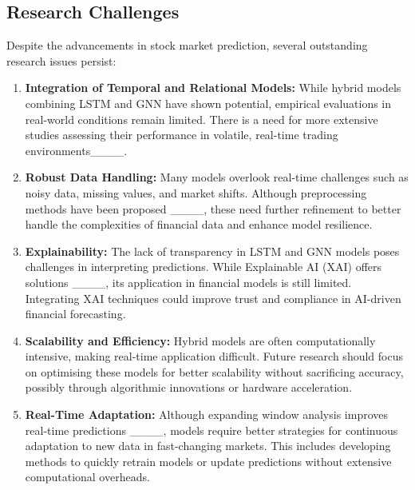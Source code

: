 \subsection{Research Challenges}

Despite the advancements in stock market prediction, several outstanding research issues persist:

\begin{enumerate}
    \item \textbf{Integration of Temporal and Relational Models:} While hybrid models combining LSTM and GNN have shown potential, empirical evaluations in real-world conditions remain limited. There is a need for more extensive studies assessing their performance in volatile, real-time trading environments____.

    \item \textbf{Robust Data Handling:} Many models overlook real-time challenges such as noisy data, missing values, and market shifts. Although preprocessing methods have been proposed ____, these need further refinement to better handle the complexities of financial data and enhance model resilience.

    \item \textbf{Explainability:} The lack of transparency in LSTM and GNN models poses challenges in interpreting predictions. While Explainable AI (XAI) offers solutions ____, its application in financial models is still limited. Integrating XAI techniques could improve trust and compliance in AI-driven financial forecasting.

    \item \textbf{Scalability and Efficiency:} Hybrid models are often computationally intensive, making real-time application difficult. Future research should focus on optimising these models for better scalability without sacrificing accuracy, possibly through algorithmic innovations or hardware acceleration.

    \item \textbf{Real-Time Adaptation:} Although expanding window analysis improves real-time predictions ____, models require better strategies for continuous adaptation to new data in fast-changing markets. This includes developing methods to quickly retrain models or update predictions without extensive computational overheads.
\end{enumerate}